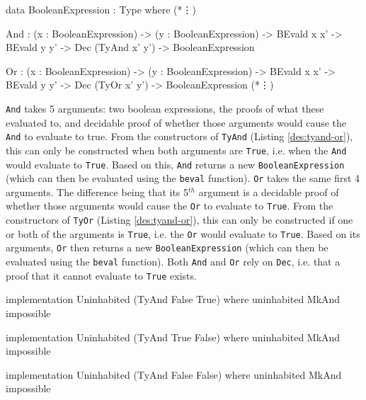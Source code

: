     \begin{code}[caption={The definitions of \texttt{And} and \texttt{Or}}, escapeinside={(*}{*)}]
            data BooleanExpression : Type where
                (*\vdots*)
                
                And :  (x : BooleanExpression)
                    -> (y : BooleanExpression)
                    -> BEvald x x'
                    -> BEvald y y'
                    -> Dec (TyAnd x' y')
                    -> BooleanExpression
                
                Or  :  (x : BooleanExpression)
                    -> (y : BooleanExpression)
                    -> BEvald x x'
                    -> BEvald y y'
                    -> Dec (TyOr x' y')
                    -> BooleanExpression
                (*\vdots*)
    \end{code}

    \texttt{And} takes 5 arguments: two boolean expressions, the proofs of what these evaluated to, and decidable proof of whether those arguments would cause the \texttt{And} to evaluate to true. From the constructors of \texttt{TyAnd} (Listing \ref{des:tyand-or}), this can only be constructed when both arguments are \texttt{True}, i.e. when the \texttt{And} would evaluate to \texttt{True}. Based on this, \texttt{And} returns a new \texttt{BooleanExpression} (which can then be evaluated using the \texttt{beval} function). \texttt{Or} takes the same first 4 arguments. The difference being that its 5$^{th}$ argument is a decidable proof of whether those arguments would cause the \texttt{Or} to evaluate to \texttt{True}. From the constructors of \texttt{TyOr} (Listing \ref{des:tyand-or}), this can only be constructed if one or both of the arguments is \texttt{True}, i.e. the \texttt{Or} would evaluate to \texttt{True}. Based on its arguments, \texttt{Or} then returns a new \texttt{BooleanExpression} (which can then be evaluated using the \texttt{beval} function). Both \texttt{And} and \texttt{Or} rely on \texttt{Dec}, i.e. that a proof that it cannot evaluate to \texttt{True} exists.
    
    \begin{code}[label={des:and-uninh}, caption={Impossible \texttt{And} cases}]
        implementation Uninhabited (TyAnd False True) where
            uninhabited MkAnd impossible
            
        implementation Uninhabited (TyAnd True False) where
            uninhabited MkAnd impossible
            
        implementation Uninhabited (TyAnd False False) where
            uninhabited MkAnd impossible
    \end{code}

